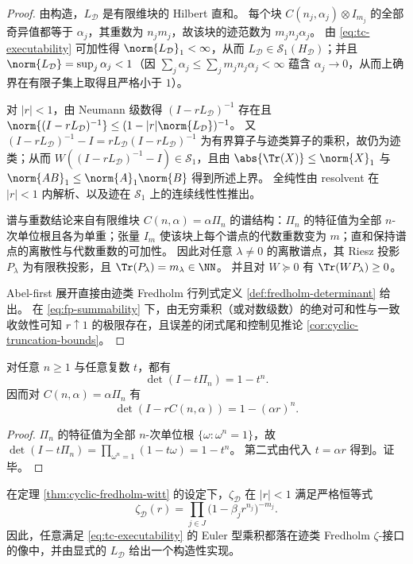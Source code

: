 \begin{proof}
由构造，\(L_{\mathcal D}\) 是有限维块的 Hilbert 直和。
每个块 \(C(n_j,\alpha_j)\otimes I_{m_j}\) 的全部奇异值都等于 \(\alpha_j\)，其重数为 \(n_jm_j\)，故该块的迹范数为 \(m_jn_j\alpha_j\)。
由 \eqref{eq:tc-executability} 可加性得 \(\norm{L_{\mathcal D}}_1<\infty\)，从而 \(L_{\mathcal D}\in\mathcal{S}_1(H_{\mathcal D})\)；并且 \(\norm{L_{\mathcal D}}=\sup_j\alpha_j<1\)（因 \(\sum_j\alpha_j\le\sum_j m_jn_j\alpha_j<\infty\) 蕴含 \(\alpha_j\to 0\)，从而上确界在有限子集上取得且严格小于 \(1\)）。

对 \(|r|<1\)，由 Neumann 级数得 \((I-rL_{\mathcal D})^{-1}\) 存在且
\(
\norm{(I-rL_{\mathcal D})^{-1}}\le (1-|r|\norm{L_{\mathcal D}})^{-1}
\)。
又 \((I-rL_{\mathcal D})^{-1}-I=rL_{\mathcal D}(I-rL_{\mathcal D})^{-1}\) 为有界算子与迹类算子的乘积，故仍为迹类；从而 \(W((I-rL_{\mathcal D})^{-1}-I)\in\mathcal{S}_1\)，且由 \(\abs{\Tr(X)}\le \norm{X}_1\) 与 \(\norm{AB}_1\le \norm{A}_1\norm{B}\) 得到所述上界。
全纯性由 resolvent 在 \(|r|<1\) 内解析、以及迹在 \(\mathcal{S}_1\) 上的连续线性性推出。

谱与重数结论来自有限维块 \(C(n,\alpha)=\alpha\Pi_n\) 的谱结构：\(\Pi_n\) 的特征值为全部 \(n\)-次单位根且各为单重；张量 \(I_{m}\) 使该块上每个谱点的代数重数变为 \(m\)；直和保持谱点的离散性与代数重数的可加性。
因此对任意 \(\lambda\ne 0\) 的离散谱点，其 Riesz 投影 \(P_\lambda\) 为有限秩投影，且 \(\Tr(P_\lambda)=m_\lambda\in\NN\)。
并且对 \(W\succeq 0\) 有 \(\Tr(WP_\lambda)\ge 0\)。

Abel-first 展开直接由迹类 Fredholm 行列式定义 \ref{def:fredholm-determinant} 给出。
在 \eqref{eq:fp-summability} 下，由无穷乘积（或对数级数）的绝对可和性与一致收敛性可知 \(r\uparrow 1\) 的极限存在，且误差的闭式尾和控制见推论 \ref{cor:cyclic-truncation-bounds}。
\end{proof}

\begin{proposition}[循环置换块的行列式恒等式]\label{prop:cycle-permutation-determinant}
对任意 \(n\ge 1\) 与任意复数 \(t\)，都有
\[
\det(I-t\Pi_n)=1-t^n.
\]
因而对 \(C(n,\alpha)=\alpha\Pi_n\) 有
\[
\det(I-rC(n,\alpha))=1-(\alpha r)^n.
\]
\end{proposition}

\begin{proof}
\(\Pi_n\) 的特征值为全部 \(n\)-次单位根 \(\{\omega:\omega^n=1\}\)，故
\(
\det(I-t\Pi_n)=\prod_{\omega^n=1}(1-t\omega)=1-t^n
\)。
第二式由代入 \(t=\alpha r\) 得到。证毕。
\end{proof}

\begin{corollary}\label{cor:cyclic-euler-product}
在定理 \ref{thm:cyclic-fredholm-witt} 的设定下，\(\zeta_{\mathcal D}\) 在 \(|r|<1\) 满足严格恒等式
\[
\zeta_{\mathcal D}(r)
=\prod_{j\in J}\bigl(1-\beta_j r^{n_j}\bigr)^{-m_j}.
\]
因此，任意满足 \eqref{eq:tc-executability} 的 Euler 型乘积都落在迹类 Fredholm \(\zeta\)-接口的像中，并由显式的 \(L_{\mathcal D}\) 给出一个构造性实现。
\end{corollary}

